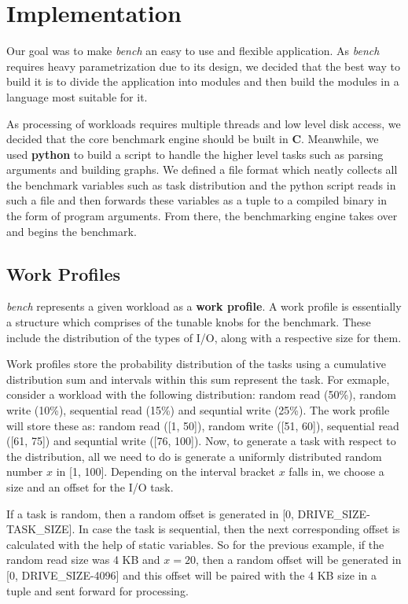 \documentclass[10pt, author, twocolumn]{article}
\begin{document}
\section{Implementation}
Our goal was to make \textit{bench} an easy to use and flexible application. As \textit{bench} requires heavy parametrization due to its design, we decided that the best way to build it is to divide the application into modules and then build the modules in a language most suitable for it.

As processing of workloads requires multiple threads and low level disk access, we decided that the core benchmark engine should be built in \textbf{C}. Meanwhile, we used \textbf{python} to build a script to handle the higher level tasks such as parsing arguments and building graphs. We defined a file format which neatly collects all the benchmark variables such as task distribution and the python script reads in such a file and then forwards these variables as a tuple to a compiled binary in the form of program arguments. From there, the benchmarking engine takes over and begins the benchmark. 

\subsection{Work Profiles}
\textit{bench} represents a given workload as a \textbf{work profile}. A work profile is essentially a structure which comprises of the tunable knobs for the benchmark. These include the distribution of the types of I/O, along with a respective size for them. 

Work profiles store the probability distribution of the tasks using a cumulative distribution sum and intervals within this sum represent the task. For exmaple, consider a workload with the following distribution: random read (50\%), random write (10\%), sequential read (15\%) and sequntial write (25\%). The work profile will store these as: random read ([1, 50]), random write ([51, 60]), sequential read ([61, 75]) and sequntial write ([76, 100]). Now, to generate a task with respect to the distribution, all we need to do is generate a uniformly distributed random number $x$ in [1, 100]. Depending on the interval bracket $x$ falls in, we choose a size and an offset for the I/O task. 

If a task is random, then a random offset is generated in [0, DRIVE\_SIZE-TASK\_SIZE]. In case the task is sequential, then the next corresponding offset is calculated with the help of static variables. So for the previous example, if the random read size was 4 KB and $x = 20$, then a random offset will be generated in [0, DRIVE\_SIZE-4096] and this offset will be paired with the 4 KB size in a tuple and sent forward for processing.
\end{document}
